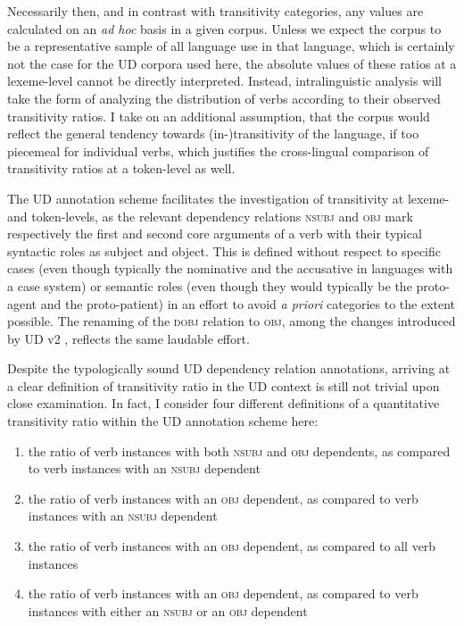 Necessarily then, and in contrast with transitivity categories, any values are calculated on an \textit{ad hoc} basis in a given corpus. Unless we expect the corpus to be a representative sample of all language use in that language, which is certainly not the case for the UD corpora used here, the absolute values of these ratios at a lexeme-level cannot be directly interpreted. Instead, intralinguistic analysis will take the form of analyzing the distribution of verbs according to their observed transitivity ratios. I take on an additional assumption, that the corpus would reflect the general tendency towards (in-)transitivity of the language, if too piecemeal for individual verbs, which justifies the cross-lingual comparison of transitivity ratios at a token-level as well.

The UD annotation scheme facilitates the investigation of transitivity at lexeme- and token-levels, as the relevant dependency relations \textsc{nsubj} and \textsc{obj} mark respectively the first and second core arguments of a verb with their typical syntactic roles as subject and object. This is defined without respect to specific cases (even though typically the nominative and the accusative in languages with a case system) or semantic roles (even though they would typically be the proto-agent and the proto-patient) in an effort to avoid \textit{a priori} categories to the extent possible. The renaming of the \textsc{dobj} relation to \textsc{obj}, among the changes introduced by UD v2 \citep{nivre2020}, reflects the same laudable effort.

Despite the typologically sound UD dependency relation annotations, arriving at a clear definition of transitivity ratio in the UD context is still not trivial upon close examination. In fact, I consider four different definitions of a quantitative transitivity ratio within the UD annotation scheme here:

\begin{enumerate}
    \item the ratio of verb instances with both \textsc{nsubj} and \textsc{obj} dependents, as compared to verb instances with an \textsc{nsubj} dependent
    \item the ratio of verb instances with an \textsc{obj} dependent, as compared to verb instances with an \textsc{nsubj} dependent
    \item the ratio of verb instances with an \textsc{obj} dependent, as compared to all verb instances
    \item the ratio of verb instances with an \textsc{obj} dependent, as compared to verb instances with either an \textsc{nsubj} or an \textsc{obj} dependent
\end{enumerate}


